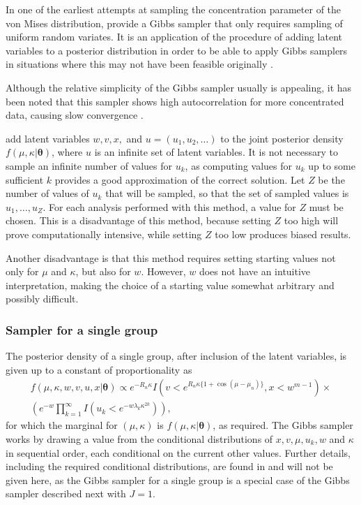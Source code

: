 \documentclass[bib]{ba/ba}
\begin{document}
In one of the earliest attempts at sampling the concentration parameter of the von Mises distribution, \citet{damien1999fullbayes} provide a Gibbs sampler that only requires sampling of uniform random variates. It is an application of the procedure of adding latent variables to a posterior distribution in order to be able to apply Gibbs samplers in situations where this may not have been feasible originally \citep{damlen1999auxiliary}. 

Although the relative simplicity of the Gibbs sampler usually is appealing, it has been noted that this sampler shows high autocorrelation for more concentrated data, causing slow convergence \citep[p. 990]{nunez2005bayesian}. %

\citet{damien1999fullbayes} add latent variables $w, v, x,$ and $u=(u_1, u_2, \dots)$ to the joint posterior density $f(\mu, \kappa \vert \boldsymbol\theta)$, where $u$ is an infinite set of latent variables. It is not necessary to sample an infinite number of values for $u_k$, as computing values for $u_k$ up to some sufficient $k$ provides a good approximation of the correct solution. Let $Z$ be the number of values of $u_k$ that will be sampled, so that the set of sampled values is $u_1, \dots, u_Z$. For each analysis performed with this method, a value for $Z$ must be chosen. This is a disadvantage of this method, because setting $Z$ too high will prove computationally intensive, while setting $Z$ too low produces biased results. 

Another disadvantage is that this method requires setting starting values  not only for $\mu$ and $\kappa$, but also for $w$. However, $w$ does not have an intuitive interpretation, making the choice of a starting value somewhat arbitrary and possibly difficult. %

\subsubsection{Sampler for a single group}

The posterior density of a single group, after inclusion of the latent variables, is given up to a constant of proportionality as
\begin{multline*}
 f (\mu, \kappa, w, v, u, x \vert \boldsymbol\theta)  \propto e^{-R_n \kappa} I(v < e^{R_{n} \kappa \{1+\cos(\mu - \mu_n)\}}, x < w^{m-1}) \times \\ 
 \left( e^{-w} \prod_{k=1}^{\infty} I(u_k < e^{-w\lambda_k\kappa^{2k}}) \right),
 \end{multline*}
for which the marginal for $(\mu, \kappa)$ is $f(\mu, \kappa \vert \boldsymbol\theta)$, as required. The Gibbs sampler works by drawing a value from the conditional distributions of $x, v, \mu, u_k, w$ and $\kappa$ in sequential order, each conditional on the current other values. Further details, including the required conditional distributions, are found in \citet{damien1999fullbayes} and will not be given here, as the Gibbs sampler for a single group is a special case of the Gibbs sampler described next with $J=1$. 
\end{document}
